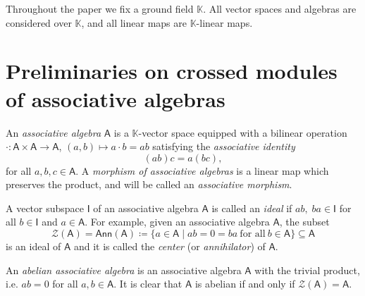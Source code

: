 \documentclass[12pt,reqno]{amsart}
\theoremstyle{plain}
\theoremstyle{definition}
\theoremstyle{remark}
\newcommand{\K}{\ensuremath{\mathbb{K}}}
\newcommand{\A}{\ensuremath{\mathsf{A}}}
\newcommand{\II}{\ensuremath{\mathsf{I}}}
\newcommand{\ZZ}{\ensuremath{\mathscr{Z}}}
\newcommand{\Ann}{\ensuremath{\mathsf{Ann}}}
\numberwithin{equation}{section}
\begin{document}
Throughout the paper we fix a ground field $\K$. All vector spaces and algebras are considered over $\K$, and all linear maps are $\K$-linear maps.


\section{Preliminaries on crossed modules of associative algebras} \label{S:Prel}

An \emph{associative algebra} $\A$ is a $\K$-vector space equipped with a bilinear operation $ \cdot \colon \A\times\A\to\A$, $(a,b) \mapsto a \cdot b =ab$ satisfying the \emph{associative identity}
\begin{equation}\label{Lb_identity}
(ab) c =a(bc),
\end{equation}
for all $a,b,c\in\A$. 
A \emph{morphism of associative algebras} is a linear map which preserves the product, and will be called an \emph{associative morphism}.

A vector subspace $\II$ of an associative algebra $\A$ is called an \emph{ideal} if $ab,\; ba\in \II$ for all $b\in \II$ and $a\in \A$. For example, given an associative algebra $\A$, the subset 
\[
\ZZ(\A)=\Ann(\A) \coloneqq \{a\in\A \mid ab=0=ba  \ \text{for all} \ b\in\A \} \subseteq \A
\]
is an ideal of $\A$ and it is called the \emph{center} (or \emph{annihilator}) of $\A$.

An \emph{abelian associative algebra} is an associative algebra $\A$ with the trivial product, i.e. $ab=0$ for all $a,b\in\A$. It is clear that $\A$ is abelian if and only if $\ZZ(\A)=\A$.
\end{document}
